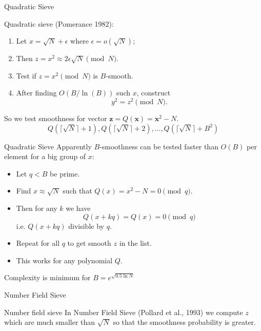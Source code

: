 \documentclass[t]{beamer}
\begin{document}
\begin{frame}{Quadratic Sieve}

Quadratic sieve (Pomerance 1982):
\begin{enumerate}
    \item Let $x = \sqrt{N}+\epsilon$ where $\epsilon =o(\sqrt{N})$;
    \item Then $z=x^2 \approx 2\epsilon\sqrt{N} \pmod{N}$.
    \item Test if $z=x^2 \pmod{N}$ is $B$-smooth. \item After finding $O(B/\ln(B))$ such $x$, construct
    $$
    y^2 = z^2\pmod{N}.
    $$
\end{enumerate}
So we test smoothness for vector $\mathbf{z} = Q(\mathbf{x}) = \mathbf{x}^2-N$.
$$
Q(\lceil\sqrt{N}\rceil+1),Q(\lceil\sqrt{N}\rceil+2),\ldots,Q(\lceil\sqrt{N}\rceil+B^2)
$$
\end{frame}

\begin{frame}{Quadratic Sieve}
 Apparently $B$-smoothness can be tested faster than $O(B)$ per element for a big group of $x$:
\begin{itemize}
    \item Let $q <B$ be prime.
    \item Find $x\approx \sqrt{N}$ such that $Q(x)=x^2-N=0\pmod{q} $.
    \item Then for any $k$ we have
    $$
    Q(x+kq) = Q(x) = 0\pmod{q}
    $$
    i.e. $Q(x+kq)$ divisible by $q$.
    \item Repeat for all $q$ to get smooth $z$ in the list.
    \item This works for any polynomial $Q$.
\end{itemize}

Complexity is minimum for $B = e^{\sqrt{0.5 \ln N}}$
\end{frame}

\begin{frame}[c]
\begin{center}
    \Large{Number Field Sieve}
    \end{center}
\end{frame}

\begin{frame}[c]{Number field sieve}
    In Number Field Sieve (Pollard et al., 1993)  we  compute $z$ which are much smaller than $\sqrt{N}$ so that the smoothness probability is greater.
\end{frame}
\end{document}
